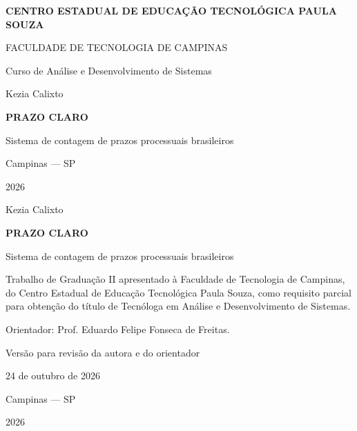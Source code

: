 \documentclass[12pt,a4paper,oneside]{report}
\renewcommand{\contentsname}{SUMÁRIO}
\renewcommand{\listfigurename}{LISTA DE FIGURAS}
\renewcommand{\listtablename}{LISTA DE TABELAS}
\renewcommand{\headrulewidth}{0pt}
\begin{document}
\renewcommand{\contentsname}{SUMÁRIO}
\renewcommand{\listfigurename}{LISTA DE FIGURAS}
\renewcommand{\listtablename}{LISTA DE TABELAS}
\pagestyle{empty}
\fancypagestyle{plain}{\fancyhf{}\renewcommand{\headrulewidth}{0pt}}
\hypersetup{pageanchor=false}
\begin{titlepage}\centering
{\bfseries CENTRO ESTADUAL DE EDUCAÇÃO TECNOLÓGICA PAULA SOUZA\par
FACULDADE DE TECNOLOGIA DE CAMPINAS\par
Curso de Análise e Desenvolvimento de Sistemas\par}
\vspace{2.3cm}
Kezia Calixto\par
\vfill
{\bfseries\fontsize{14}{20}\selectfont PRAZO CLARO\par
Sistema de contagem de prazos processuais brasileiros\par}
\vfill
Campinas --- SP\par 2026
\end{titlepage}
\setcounter{page}{1}
\hypersetup{pageanchor=true}
\thispagestyle{empty}
\begin{center}Kezia Calixto\end{center}
\vspace{2.2cm}
\begin{center}\bfseries\fontsize{14}{20}\selectfont PRAZO CLARO\par
Sistema de contagem de prazos processuais brasileiros\end{center}
\vspace{2cm}
\begin{flushright}\begin{minipage}{.54\textwidth}\begin{singlespace}
Trabalho de Graduação II apresentado à Faculdade de Tecnologia de Campinas, do Centro Estadual de Educação Tecnológica Paula Souza, como requisito parcial para obtenção do título de Tecnóloga em Análise e Desenvolvimento de Sistemas.\par\medskip
Orientador: Prof. Eduardo Felipe Fonseca de Freitas.
\end{singlespace}\end{minipage}\end{flushright}
\vfill
\begin{center}Versão para revisão da autora e do orientador\par
24 de outubro de 2026\par\vspace{1cm}Campinas --- SP\par 2026\end{center}
\clearpage
\end{document}
